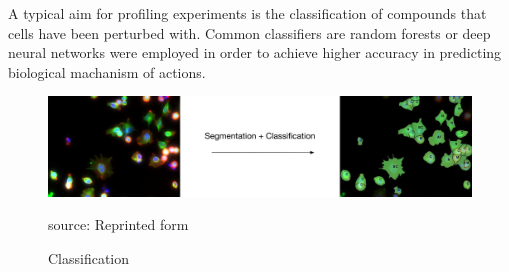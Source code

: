 A typical aim for profiling experiments is the classification of compounds that cells have been perturbed with. Common classifiers are random forests or deep neural networks were employed in order to achieve higher accuracy in predicting biological machanism of actions.


\begin{figure}[H]
	\centering
	\includegraphics[width=0.8\linewidth]{bilder/cells/classification.png}
	\caption{Classification}
	source: Reprinted form \cite{Pau}
	\label{fig:Classification}
\end{figure}




